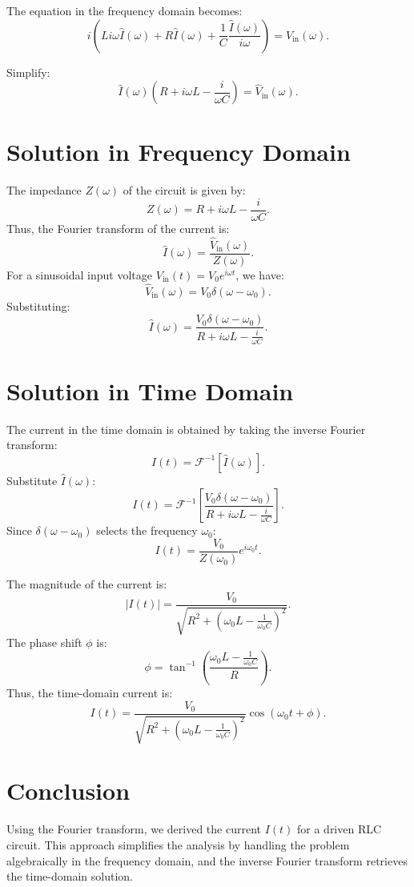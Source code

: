 \documentclass[a4paper,11pt]{article}
\begin{document}
The equation in the frequency domain becomes:
\[
i\left(L i\omega \hat{I}(\omega) + R \hat{I}(\omega) + \frac{1}{C} \frac{\hat{I}(\omega)}{i\omega}\right) = \hat{V}_{\text{in}}(\omega).
\]

Simplify:
\[
\hat{I}(\omega) \left(R + i\omega L - \frac{i}{\omega C}\right) = \hat{V}_{\text{in}}(\omega).
\]

\section*{Solution in Frequency Domain}
The impedance \(Z(\omega)\) of the circuit is given by:
\[
Z(\omega) = R + i\omega L - \frac{i}{\omega C}.
\]
Thus, the Fourier transform of the current is:
\[
\hat{I}(\omega) = \frac{\hat{V}_{\text{in}}(\omega)}{Z(\omega)}.
\]
For a sinusoidal input voltage \(V_{\text{in}}(t) = V_0 e^{i\omega t}\), we have:
\[
\hat{V}_{\text{in}}(\omega) = V_0 \delta(\omega - \omega_0).
\]
Substituting:
\[
\hat{I}(\omega) = \frac{V_0 \delta(\omega - \omega_0)}{R + i\omega L - \frac{i}{\omega C}}.
\]

\section*{Solution in Time Domain}
The current in the time domain is obtained by taking the inverse Fourier transform:
\[
I(t) = \mathcal{F}^{-1}\left[\hat{I}(\omega)\right].
\]
Substitute \(\hat{I}(\omega)\):
\[
I(t) = \mathcal{F}^{-1}\left[\frac{V_0 \delta(\omega - \omega_0)}{R + i\omega L - \frac{i}{\omega C}}\right].
\]
Since \(\delta(\omega - \omega_0)\) selects the frequency \(\omega_0\):
\[
I(t) = \frac{V_0}{Z(\omega_0)} e^{i\omega_0 t}.
\]

The magnitude of the current is:
\[
|I(t)| = \frac{V_0}{\sqrt{R^2 + \left(\omega_0 L - \frac{1}{\omega_0 C}\right)^2}}.
\]
The phase shift \(\phi\) is:
\[
\phi = \tan^{-1}\left(\frac{\omega_0 L - \frac{1}{\omega_0 C}}{R}\right).
\]
Thus, the time-domain current is:
\[
I(t) = \frac{V_0}{\sqrt{R^2 + \left(\omega_0 L - \frac{1}{\omega_0 C}\right)^2}} \cos(\omega_0 t + \phi).
\]

\section*{Conclusion}
Using the Fourier transform, we derived the current \(I(t)\) for a driven RLC circuit. This approach simplifies the analysis by handling the problem algebraically in the frequency domain, and the inverse Fourier transform retrieves the time-domain solution.
\end{document}
